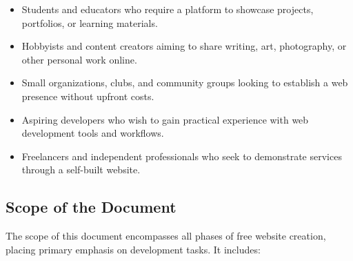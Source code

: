 \begin{itemize}
    \item Students and educators who require a platform to showcase projects, portfolios, or learning materials.
    \item Hobbyists and content creators aiming to share writing, art, photography, or other personal work online.
    \item Small organizations, clubs, and community groups looking to establish a web presence without upfront costs.
    \item Aspiring developers who wish to gain practical experience with web development tools and workflows.
    \item Freelancers and independent professionals who seek to demonstrate services through a self-built website.
\end{itemize}

\subsection{Scope of the Document}

The scope of this document encompasses all phases of free website creation, placing primary emphasis on development tasks. It includes:

